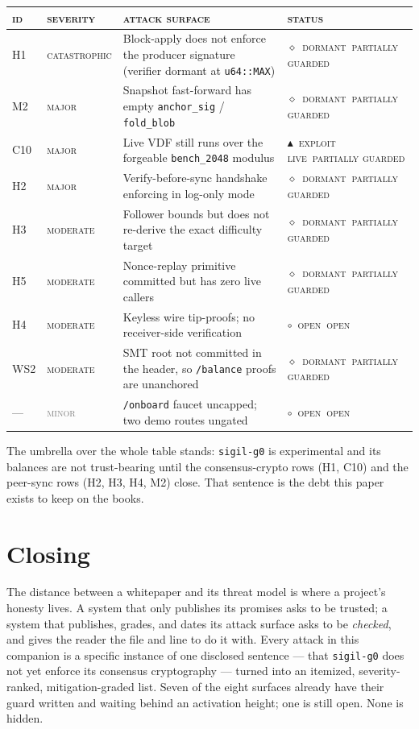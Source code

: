 \documentclass[10pt,a4paper]{article}
\newcommand{\stO}{\textcolor{sigilamber}{$\circ$}~{\scriptsize\textcolor{sigilamber}{\textsc{open}}}}
\newcommand{\stD}{\textcolor{sigilviolet}{$\diamond$}~{\scriptsize\textcolor{sigilviolet}{\textsc{dormant}}}}
\newcommand{\stXL}{\textcolor{sigilred}{$\blacktriangle$}~{\scriptsize\textcolor{sigilred}{\textsc{exploit live}}}}
\newcommand{\svC}{{\scriptsize\textcolor{sigilred}{\textsc{catastrophic}}}}
\newcommand{\svM}{{\scriptsize\textcolor{sigilamber}{\textsc{major}}}}
\newcommand{\svMod}{{\scriptsize\textcolor{sigilblue}{\textsc{moderate}}}}
\newcommand{\svMin}{{\scriptsize\textcolor{gray}{\textsc{minor}}}}
\newcommand{\mgPartial}{{\scriptsize\textcolor{sigilviolet}{\textsc{partially guarded}}}}
\newcommand{\mgOpen}{{\scriptsize\textcolor{sigilamber}{\textsc{open}}}}
\begin{document}
\begin{center}
\small
\renewcommand{\arraystretch}{1.3}
\begin{tabular}{@{}llp{7.5cm}l@{}}
\rowcolor{rowtint}
\textsc{id} & \textsc{severity} & \textsc{attack surface} & \textsc{status}\\
\midrule
H1 & \svC & Block-apply does not enforce the producer signature (verifier dormant at \texttt{u64::MAX}) & \stD~\mgPartial\\
M2 & \svM & Snapshot fast-forward has empty \texttt{anchor\_sig} / \texttt{fold\_blob} & \stD~\mgPartial\\
C10 & \svM & Live VDF still runs over the forgeable \texttt{bench\_2048} modulus & \stXL~\mgPartial\\
H2 & \svM & Verify-before-sync handshake enforcing in log-only mode & \stD~\mgPartial\\
H3 & \svMod & Follower bounds but does not re-derive the exact difficulty target & \stD~\mgPartial\\
H5 & \svMod & Nonce-replay primitive committed but has zero live callers & \stD~\mgPartial\\
H4 & \svMod & Keyless wire tip-proofs; no receiver-side verification & \stO~\mgOpen\\
WS2 & \svMod & SMT root not committed in the header, so \texttt{/balance} proofs are unanchored & \stD~\mgPartial\\
\midrule
--- & \svMin & \texttt{/onboard} faucet uncapped; two demo routes ungated & \stO~\mgOpen\\
\bottomrule
\end{tabular}
\end{center}

\noindent
The umbrella over the whole table stands: \texttt{sigil-g0} is experimental and its
balances are not trust-bearing until the consensus-crypto rows (H1, C10) and the
peer-sync rows (H2, H3, H4, M2) close. That sentence is the debt this paper exists to keep
on the books.

\section{Closing}
\label{sec:closing}

The distance between a whitepaper and its threat model is where a project's honesty lives.
A system that only publishes its promises asks to be trusted; a system that publishes,
grades, and dates its attack surface asks to be \emph{checked}, and gives the reader the
file and line to do it with. Every attack in this companion is a specific instance of one
disclosed sentence — that \texttt{sigil-g0} does not yet enforce its consensus cryptography
— turned into an itemized, severity-ranked, mitigation-graded list. Seven of the eight
surfaces already have their guard written and waiting behind an activation height; one is
still open. None is hidden.
\end{document}
